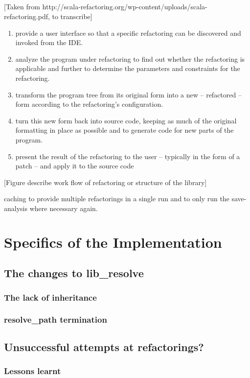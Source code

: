 \subsection{}
[Taken from http://scala-refactoring.org/wp-content/uploads/scala-refactoring.pdf, to transcribe]
\begin{enumerate}
\item provide a user interface so that a specific refactoring can be discovered and
invoked from the IDE.
\item analyze the program under refactoring to find out whether the refactoring is
applicable  and  further  to  determine  the  parameters  and  constraints  for  the
refactoring.
\item transform the program tree from its original form into a new – refactored – form
according to the refactoring’s configuration.
\item turn this new form back into source code,  keeping as much of the original
formatting in place as possible and to generate code for new parts of the program.
\item present the result of the refactoring to the user – typically in the form of a patch –
and apply it to the source code
\end{enumerate}

[Figure describe work flow of refactoring or structure of the library]

caching to provide multiple refactorings in a single run and to only run the save-analysis where necessary again. 

\subsection{}
\subsection{}

\section{Specifics of the Implementation}
\subsection{The changes to lib_resolve}
\subsubsection{The lack of inheritance}
\subsubsection{resolve_path termination}

\subsection{Unsuccessful attempts at refactorings?}
\subsubsection{Lessons learnt}